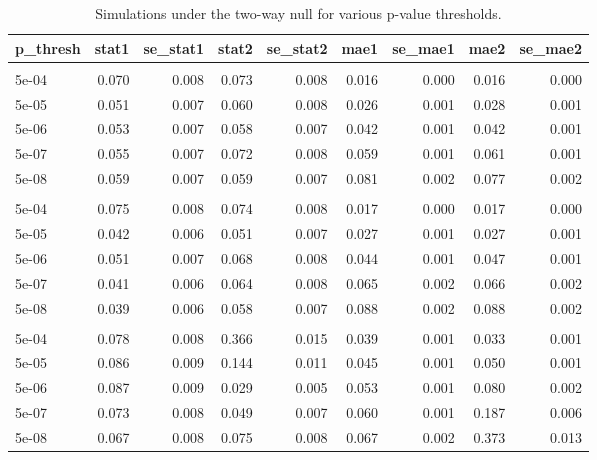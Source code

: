\documentclass{article}
\begin{document}
\newpage
\begin{table}[H]\label{supptable1}
\centering
\begin{tabular}{lrrrrrrrr}
\toprule
p\_thresh & stat1 & se\_stat1 & stat2 & se\_stat2 & mae1 & se\_mae1 & mae2 & se\_mae2\\
\midrule
\addlinespace[0.3em]
\multicolumn{9}{l}{\textbf{Null: Uncorrelated pleiotropy}}\\
\hspace{1em}5e-04 & 0.070 & 0.008 & 0.073 & 0.008 & 0.016 & 0.000 & 0.016 & 0.000\\
\hspace{1em}5e-05 & 0.051 & 0.007 & 0.060 & 0.008 & 0.026 & 0.001 & 0.028 & 0.001\\
\hspace{1em}5e-06 & 0.053 & 0.007 & 0.058 & 0.007 & 0.042 & 0.001 & 0.042 & 0.001\\
\hspace{1em}5e-07 & 0.055 & 0.007 & 0.072 & 0.008 & 0.059 & 0.001 & 0.061 & 0.001\\
\hspace{1em}5e-08 & 0.059 & 0.007 & 0.059 & 0.007 & 0.081 & 0.002 & 0.077 & 0.002\\
\addlinespace[0.3em]
\multicolumn{9}{l}{\textbf{Null: Correlated pleiotropy}}\\
\hspace{1em}5e-04 & 0.075 & 0.008 & 0.074 & 0.008 & 0.017 & 0.000 & 0.017 & 0.000\\
\hspace{1em}5e-05 & 0.042 & 0.006 & 0.051 & 0.007 & 0.027 & 0.001 & 0.027 & 0.001\\
\hspace{1em}5e-06 & 0.051 & 0.007 & 0.068 & 0.008 & 0.044 & 0.001 & 0.047 & 0.001\\
\hspace{1em}5e-07 & 0.041 & 0.006 & 0.064 & 0.008 & 0.065 & 0.002 & 0.066 & 0.002\\
\hspace{1em}5e-08 & 0.039 & 0.006 & 0.058 & 0.007 & 0.088 & 0.002 & 0.088 & 0.002\\
\addlinespace[0.3em]
\multicolumn{9}{l}{\textbf{Null: Correlated pleiotropy, unequal power}}\\
\hspace{1em}5e-04 & 0.078 & 0.008 & 0.366 & 0.015 & 0.039 & 0.001 & 0.033 & 0.001\\
\hspace{1em}5e-05 & 0.086 & 0.009 & 0.144 & 0.011 & 0.045 & 0.001 & 0.050 & 0.001\\
\hspace{1em}5e-06 & 0.087 & 0.009 & 0.029 & 0.005 & 0.053 & 0.001 & 0.080 & 0.002\\
\hspace{1em}5e-07 & 0.073 & 0.008 & 0.049 & 0.007 & 0.060 & 0.001 & 0.187 & 0.006\\
\hspace{1em}5e-08 & 0.067 & 0.008 & 0.075 & 0.008 & 0.067 & 0.002 & 0.373 & 0.013\\
\bottomrule
\end{tabular}
\caption{Simulations under the two-way null for various p-value thresholds.}
\end{table}
\end{document}

